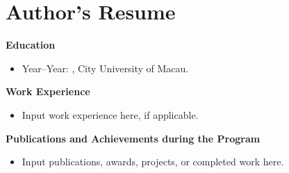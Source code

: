 \clearpage
\chapter*{Author's Resume}
{}

\noindent\textbf{Education}
\begin{itemize}
  \item Year--Year: \thesisprogram, City University of Macau.
\end{itemize}

\vspace{0.5cm}

\noindent\textbf{Work Experience}
\begin{itemize}
  \item Input work experience here, if applicable.
\end{itemize}

\vspace{0.5cm}

\noindent\textbf{Publications and Achievements during the Program}
\begin{itemize}
  \item Input publications, awards, projects, or completed work here.
\end{itemize}
